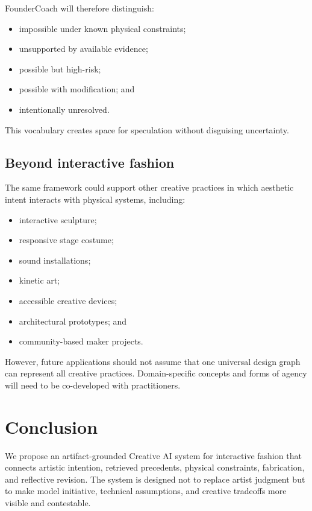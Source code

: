 \documentclass{article}
\begin{document}
FounderCoach will therefore distinguish:

\begin{itemize}[leftmargin=*]
    \item impossible under known physical constraints;
    \item unsupported by available evidence;
    \item possible but high-risk;
    \item possible with modification; and
    \item intentionally unresolved.
\end{itemize}

This vocabulary creates space for speculation without disguising uncertainty.

\subsection{Beyond interactive fashion}

The same framework could support other creative practices in which aesthetic
intent interacts with physical systems, including:

\begin{itemize}[leftmargin=*]
    \item interactive sculpture;
    \item responsive stage costume;
    \item sound installations;
    \item kinetic art;
    \item accessible creative devices;
    \item architectural prototypes; and
    \item community-based maker projects.
\end{itemize}

However, future applications should not assume that one universal design graph
can represent all creative practices. Domain-specific concepts and forms of
agency will need to be co-developed with practitioners.

\section{Conclusion}

We propose an artifact-grounded Creative AI system for interactive fashion that
connects artistic intention, retrieved precedents, physical constraints,
fabrication, and reflective revision. The system is designed not to replace
artist judgment but to make model initiative, technical assumptions, and
creative tradeoffs more visible and contestable.
\end{document}
